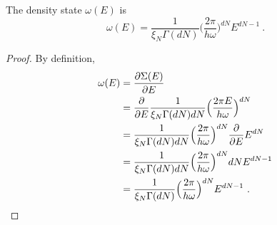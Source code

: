     The density state $\omega(E)$ is
    \begin{equation*}
        \omega (E) = \frac{1}{\xi_N \Gamma (dN)} \Big (\frac{2 \pi}{h \omega} \Big )^{dN} E^{dN-1} ~.
    \end{equation*}
    \begin{proof}
        By definition, 
        \begin{equation*}
        \begin{aligned}
            \omega (E) &= \frac{\partial\Sigma (E)}{\partial E} \\ & = \frac{\partial}{\partial E} \frac{1}{\xi_N \Gamma (dN) dN} \Big (\frac{2 \pi E}{h \omega} \Big )^{dN} \\ & = \frac{1}{\xi_N \Gamma (dN) dN} \Big (\frac{2 \pi}{h \omega} \Big )^{dN} \frac{\partial}{\partial E} E^{dN} \\ & = \frac{1}{\xi_N \Gamma (dN) dN} \Big (\frac{2 \pi}{h \omega} \Big )^{dN} dN E^{dN-1} \\ & = \frac{1}{\xi_N \Gamma (dN)} \Big (\frac{2 \pi}{h \omega} \Big )^{dN} E^{dN-1} ~.
        \end{aligned}
        \end{equation*}
    \end{proof}


